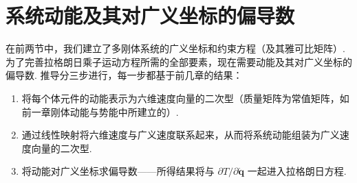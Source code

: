 \section{系统动能及其对广义坐标的偏导数}
在前两节中，我们建立了多刚体系统的广义坐标和约束方程（及其雅可比矩阵）. 为了完善拉格朗日乘子运动方程所需的全部要素，现在需要动能及其对广义坐标的偏导数. 推导分三步进行，每一步都基于前几章的结果：
\begin{enumerate}

\item 将每个体元件的动能表示为六维速度向量的二次型（质量矩阵为常值矩阵，如前一章刚体动能与势能中所建立的）.

\item 通过线性映射将六维速度与广义速度联系起来，从而将系统动能组装为广义速度向量的二次型.

\item 将动能对广义坐标求偏导数——所得结果将与 $\partial T / \partial \dot{\boldsymbol{q}}$ 一起进入拉格朗日方程.

\end{enumerate}
